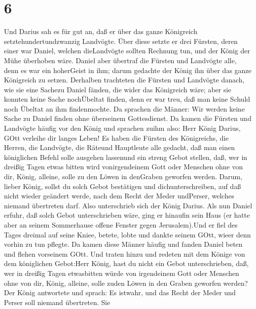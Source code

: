 \hypertarget{section-5}{%
\section{6}\label{section-5}}

 Und Darius sah es für gut an, daß er über das ganze
Königreich setztehundertundzwanzig Landvögte.  Über diese
setzte er drei Fürsten, deren einer war Daniel, welchen dieLandvögte
sollten Rechnung tun, und der König der Mühe überhoben wäre.
 Daniel aber übertraf die Fürsten und Landvögte alle, denn
es war ein hoherGeist in ihm; darum gedachte der König ihn über das
ganze Königreich zu setzen.  Derhalben trachteten die
Fürsten und Landvögte danach, wie sie eine Sachezu Daniel fänden, die
wider das Königreich wäre; aber sie konnten keine Sache nochÜbeltat
finden, denn er war treu, daß man keine Schuld noch Übeltat an ihm
findenmochte.  Da sprachen die Männer: Wir werden keine
Sache zu Daniel finden ohne überseinem Gottesdienst.  Da
kamen die Fürsten und Landvögte häufig vor den König und sprachen zuihm
also: Herr König Darius, GOtt verleihe dir langes Leben!  Es
haben die Fürsten des Königreichs, die Herren, die Landvögte, die
Räteund Hauptleute alle gedacht, daß man einen königlichen Befehl solle
ausgehen lassenund ein streng Gebot stellen, daß, wer in dreißig Tagen
etwas bitten wird vonirgendeinem Gott oder Menschen ohne von dir, König,
alleine, solle zu den Löwen in denGraben geworfen werden. 
Darum, lieber König, sollst du solch Gebot bestätigen und
dichunterschreiben, auf daß nicht wieder geändert werde, nach dem Recht
der Meder undPerser, welches niemand übertreten darf.  Also
unterschrieb sich der König Darius.  Als nun Daniel erfuhr,
daß solch Gebot unterschrieben wäre, ging er hinaufin sein Haus (er
hatte aber an seinem Sommerhause offene Fenster gegen Jerusalem).Und er
fiel des Tages dreimal auf seine Kniee, betete, lobte und dankte seinem
GOtt, wieer denn vorhin zu tun pflegte.  Da kamen diese
Männer häufig und fanden Daniel beten und flehen vorseinem GOtt.
 Und traten hinzu und redeten mit dem Könige von dem
königlichen Gebot:Herr König, hast du nicht ein Gebot unterschrieben,
daß, wer in dreißig Tagen etwasbitten würde von irgendeinem Gott oder
Menschen ohne von dir, König, alleine, solle zuden Löwen in den Graben
geworfen werden? Der König antwortete und sprach: Es istwahr, und das
Recht der Meder und Perser soll niemand übertreten.  Sie
